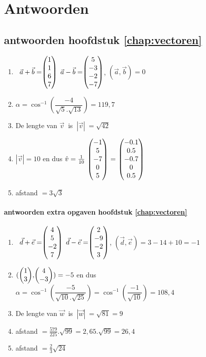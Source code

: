 \chapter{Antwoorden}

\section{antwoorden  hoofdstuk \ref{chap:vectoren}}
\begin{enumerate}
	\item   \ $ \vec{a} + \vec{b}  = \vecvier{1}{1}{6}{7} $   \qquad $ \vec{a} - \vec{b} = \vecvier{5}{-3}{-2}{-7} $,   \qquad $  (\vec{a} , \vec{b}) = 0 $ 
	
	
	\item  $\alpha = \cos ^{-1} (\dfrac{-4}{\sqrt{5}.\sqrt{13}}) = 119,7 $ 
	
	\item De lengte van  $  \vec{v} \ $ is $ \ |\vec{v}| \  =  \sqrt{42}$
	
	\item $|\vec{v}| = 10$ en dus $ \hat{v} = \frac{1}{10}\  \vecvijf{-1}{5}{-7}{0}{5} \  = \  \vecvijf{-0.1}{0.5}{-0.7}{0}{0.5} $
	
	\item afstand  $ = 3\sqrt{3} $
\end{enumerate}

\subsubsection{antwoorden extra opgaven hoofdstuk \ref{chap:vectoren}}
\begin{enumerate}
	
	\item  \ $ \vec{d} + \vec{e}  = \vecvier{4}{5}{-2}{7} $   \qquad $ \vec{d} - \vec{e} = \vecvier{2}{-9}{-2}{3} $,   \qquad $  (\vec{d} , \vec{e}) = 3-14+10 = -1 $ 
	
	\item $  (\vectwee{1}{3} , \vectwee{4}{-3}) = -5 $  en dus $\alpha = \cos ^{-1} (\dfrac{-5}{\sqrt{10}.\sqrt{25}})= \cos ^{-1} (\dfrac{-1}{\sqrt{10}}) = 108,4 $ 
	
	\item De lengte van  $  \vec{w} \ $ is $ \ |\vec{w}| \  =  \sqrt{81} = 9 $
	
	\item afstand  $ = \frac{579}{225}.\sqrt{99} = 2,65 . \sqrt{99} = 26,4 $
	
	\item    afstand  $ = \frac{2}{3}\sqrt{24} $
\end{enumerate}	

